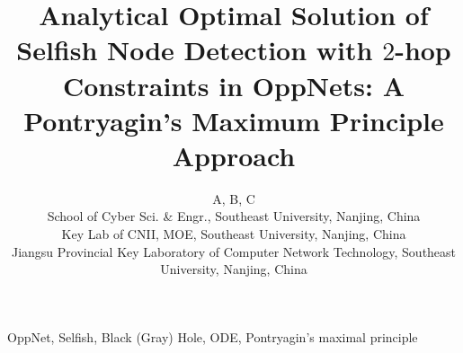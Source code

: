 \documentclass[10pt,conference]{IEEEtran}
\begin{document}
%
\title{
Analytical Optimal Solution of Selfish Node Detection with $2$-hop Constraints in OppNets: A Pontryagin's Maximum Principle Approach
}
\author{A, B, C\\
        School of Cyber Sci. \& Engr., Southeast University, Nanjing, China\\
        Key Lab of CNII, MOE, Southeast University, Nanjing, China\\
        Jiangsu Provincial Key Laboratory of Computer Network Technology, Southeast University, Nanjing, China\\
        }
\maketitle

%
\begin{IEEEkeywords}
OppNet, Selfish, Black (Gray) Hole, ODE, Pontryagin's maximal principle
\end{IEEEkeywords}











\end{document}
